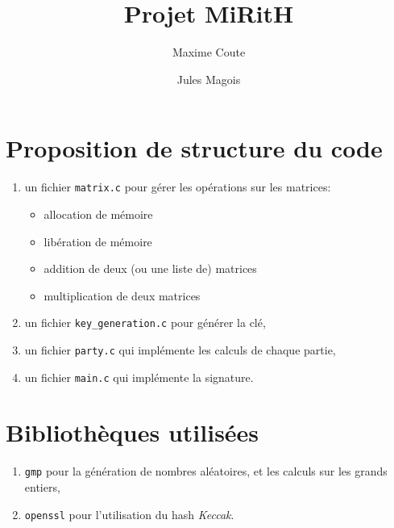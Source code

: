 \documentclass{article}
\title{Projet MiRitH}
\author{Maxime Coute \and Jules Magois}
\begin{document}
\maketitle

\section{Proposition de structure du code}

\begin{enumerate}
  \item un fichier \verb!matrix.c! pour gérer les opérations sur les matrices:
        \begin{itemize}
          \item allocation de mémoire
          \item libération de mémoire
          \item addition de deux (ou une liste de) matrices
          \item multiplication de deux matrices
        \end{itemize}
  \item un fichier \verb!key_generation.c! pour générer la clé,
  \item un fichier \verb!party.c! qui implémente les calculs de chaque partie,
  \item un fichier \verb!main.c! qui implémente la signature.
\end{enumerate}

\section{Bibliothèques utilisées}
\begin{enumerate}
  \item \verb!gmp! pour la génération de nombres aléatoires, et les calculs sur les grands entiers,
    \item \verb!openssl! pour l'utilisation du hash \emph{Keccak}.
\end{enumerate}
\end{document}
